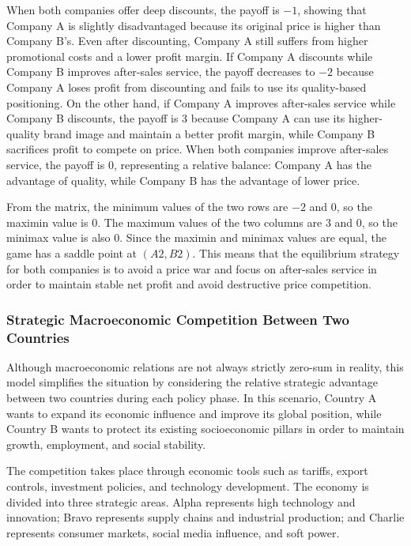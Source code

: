 \documentclass[12pt,a4paper]{article}
\begin{document}
When both companies offer deep discounts, the payoff is $-1$, showing that Company A is slightly disadvantaged because its original price is higher than Company B's. Even after discounting, Company A still suffers from higher promotional costs and a lower profit margin. If Company A discounts while Company B improves after-sales service, the payoff decreases to $-2$ because Company A loses profit from discounting and fails to use its quality-based positioning. On the other hand, if Company A improves after-sales service while Company B discounts, the payoff is $3$ because Company A can use its higher-quality brand image and maintain a better profit margin, while Company B sacrifices profit to compete on price. When both companies improve after-sales service, the payoff is $0$, representing a relative balance: Company A has the advantage of quality, while Company B has the advantage of lower price.

From the matrix, the minimum values of the two rows are $-2$ and $0$, so the maximin value is $0$. The maximum values of the two columns are $3$ and $0$, so the minimax value is also $0$. Since the maximin and minimax values are equal, the game has a saddle point at $(A2,B2)$. This means that the equilibrium strategy for both companies is to avoid a price war and focus on after-sales service in order to maintain stable net profit and avoid destructive price competition.

\subsubsection{Strategic Macroeconomic Competition Between Two Countries}

Although macroeconomic relations are not always strictly zero-sum in reality, this model simplifies the situation by considering the relative strategic advantage between two countries during each policy phase. In this scenario, Country A wants to expand its economic influence and improve its global position, while Country B wants to protect its existing socioeconomic pillars in order to maintain growth, employment, and social stability.

The competition takes place through economic tools such as tariffs, export controls, investment policies, and technology development. The economy is divided into three strategic areas. Alpha represents high technology and innovation; Bravo represents supply chains and industrial production; and Charlie represents consumer markets, social media influence, and soft power.
\end{document}
